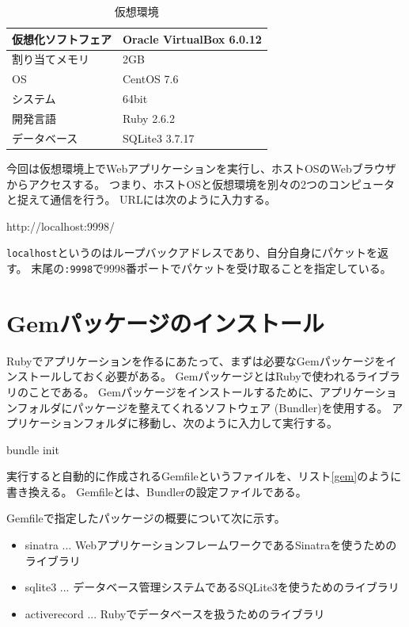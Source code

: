 \documentclass[a4j,titlepage]{jsarticle}
\begin{document}
\begin{table}[H]
  \centering
  \caption{仮想環境}
  \label{tb:virtual}

  \begin{tabular}{|l|l|}
    \hline
    仮想化ソフトフェア & Oracle VirtualBox 6.0.12 \\ \hline
    割り当てメモリ & 2GB \\ \hline
    OS & CentOS 7.6 \\ \hline
    システム & 64bit \\ \hline
    開発言語 & Ruby 2.6.2 \\ \hline
    データベース & SQLite3 3.7.17 \\ \hline
  \end{tabular}
\end{table}

今回は仮想環境上でWebアプリケーションを実行し、ホストOSのWebブラウザからアクセスする。
つまり、ホストOSと仮想環境を別々の2つのコンピュータと捉えて通信を行う。
URLには次のように入力する。

\begin{mdframed}
  http://localhost:9998/
\end{mdframed}

\texttt{localhost}というのはループバックアドレスであり、自分自身にパケットを返す。
末尾の\texttt{:9998}で9998番ポートでパケットを受け取ることを指定している。


\section{Gemパッケージのインストール}
Rubyでアプリケーションを作るにあたって、まずは必要なGemパッケージをインストールしておく必要がある。
GemパッケージとはRubyで使われるライブラリのことである。
Gemパッケージをインストールするために、アプリケーションフォルダにパッケージを整えてくれるソフトウェア (Bundler)を使用する。
アプリケーションフォルダに移動し、次のように入力して実行する。

\begin{mdframed}
  bundle init
\end{mdframed}

実行すると自動的に作成されるGemfileというファイルを、リスト\ref{gem}のように書き換える。
Gemfileとは、Bundlerの設定ファイルである。



Gemfileで指定したパッケージの概要について次に示す。

\begin{itemize}
  \item{sinatra ... WebアプリケーションフレームワークであるSinatraを使うためのライブラリ}
  \item{sqlite3 ... データベース管理システムであるSQLite3を使うためのライブラリ}
  \item{activerecord ... Rubyでデータベースを扱うためのライブラリ}
\end{itemize}
\end{document}
